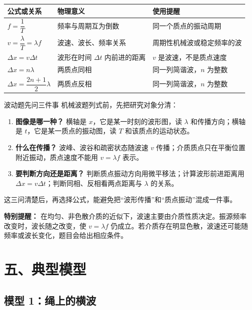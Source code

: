 \begin{center}
\begin{tabular}{lll}
\toprule
公式或关系 & 物理意义 & 使用提醒 \\
\midrule
$f=\dfrac{1}{T}$ & 频率与周期互为倒数 & 同一个质点的振动周期 \\
$v=\dfrac{\lambda}{T}=\lambda f$ & 波速、波长、频率关系 & 周期性机械波或稳定频率的波 \\
$\Delta x=v\Delta t$ & 波形在时间 $\Delta t$ 内前进的距离 & $v$ 是波速，不是质点速度 \\
$\Delta x=n\lambda$ & 两质点同相 & 同一列简谐波，$n$ 为整数 \\
$\Delta x=\dfrac{2n+1}{2}\lambda$ & 两质点反相 & 同一列简谐波，$n$ 为整数 \\
\bottomrule
\end{tabular}
\end{center}

\begin{learningbox}{波动题先问三件事}
机械波题列式前，先把研究对象分清：
\begin{enumerate}
  \item \textbf{图像是哪一种？} 横轴是 $x$，它是某一时刻的波形图，读 $\lambda$ 和传播方向；横轴是 $t$，它是某一质点的振动图，读 $T$ 和该质点的运动状态。
  \item \textbf{什么在传播？} 波峰、波谷和疏密状态随波速 $v$ 传播；介质质点只在平衡位置附近振动，质点速度不能用 $v=\lambda f$ 表示。
  \item \textbf{要判断方向还是距离？} 判断质点振动方向用微平移法；计算波形前进距离用 $\Delta x=v\Delta t$；判断同相、反相看两点距离与 $\lambda$ 的关系。
\end{enumerate}
这三问清楚后，再选择公式，能避免把“波形传播”和“质点振动”混成一件事。
\end{learningbox}

\textbf{特别提醒：} 在均匀、非色散介质的近似下，波速主要由介质性质决定。振源频率改变时，波长随之改变，使 $v=\lambda f$ 仍成立。若介质存在明显色散，波速还可能随频率或波长变化，题目会给出相应条件。

\section*{五、典型模型}

\subsection*{模型 1：绳上的横波}

